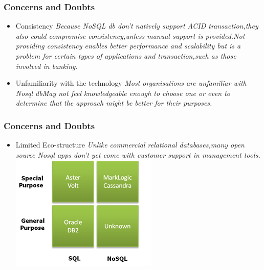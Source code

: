 \documentclass{beamer}
\begin{document}
\begin{frame}\frametitle{Concerns and Doubts}
\begin{itemize}
\item Consistency \newline
\textit{Because NoSQL db don't natively support ACID transaction,they also could compromise consistency,unless manual support is provided.\newline Not providing consistency enables better performance and scalability but is a problem for certain types of applications and transaction,such as those involved in banking.}
\newline
\item Unfamiliarity with the technology \newline
\textit{Most organisations are unfamiliar with Nosql db\newline May not feel knowledgeable enough to choose one or even to determine that the approach might be better for their purposes.}
\end{itemize}
\end{frame}

\begin{frame}\frametitle{Concerns and Doubts}
\begin{itemize}
\item Limited Eco-structure \newline
\textit{Unlike commercial relational databases,many open source Nosql apps don't yet come with customer support in management tools.} \newline
\includegraphics[scale=.60]{nosql-quadrant11.png}
\end{itemize}
\end{frame}
\end{document}
